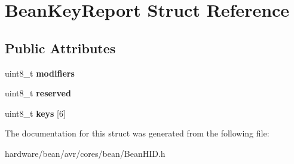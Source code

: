 \hypertarget{struct_bean_key_report}{}\section{Bean\+Key\+Report Struct Reference}
\label{struct_bean_key_report}
\subsection*{Public Attributes}
\begin{DoxyCompactItemize}
\item 
\hypertarget{struct_bean_key_report_a738669ce0170204f8c7488521f6c74d6}{}uint8\+\_\+t {\bfseries modifiers}\label{struct_bean_key_report_a738669ce0170204f8c7488521f6c74d6}

\item 
\hypertarget{struct_bean_key_report_a573075fb85511db508b4e26d0b72fa54}{}uint8\+\_\+t {\bfseries reserved}\label{struct_bean_key_report_a573075fb85511db508b4e26d0b72fa54}

\item 
\hypertarget{struct_bean_key_report_a0e91895dae561cd31004bd644d255115}{}uint8\+\_\+t {\bfseries keys} \mbox{[}6\mbox{]}\label{struct_bean_key_report_a0e91895dae561cd31004bd644d255115}

\end{DoxyCompactItemize}


The documentation for this struct was generated from the following file\+:\begin{DoxyCompactItemize}
\item 
hardware/bean/avr/cores/bean/Bean\+H\+I\+D.\+h\end{DoxyCompactItemize}
